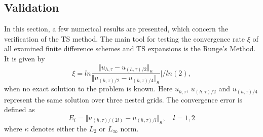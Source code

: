 \documentclass[11pt,a4paper,twoside]{article}
\begin{document}
\subsection{Validation}
In this section, a few numerical results are presented, which concern the verification of the TS method. The main tool for testing the convergence rate $\xi$ of all examined finite difference schemes and TS expansions is the Runge's Method. It is given by
\begin{equation}\label{Runge}
\xi = ln  \frac{\Vert u_{h,\tau} - u_{(h,\tau)/2} \Vert_\kappa } {\Vert  u_{(h,\tau)/2} - u_{(h,\tau)/4} \Vert_\kappa  } | / ln(2),
\end{equation}
when no exact solution to the problem is known. Here $u_{h,\tau}$, $u_{(h,\tau)/2}$ and $u_{(h,\tau)/4}$ represent the same solution over three nested grids. The convergence error is defined as
\begin{equation}\label{Norm}
E_i = \Vert u_{(h,\tau)/(2l)} - u_{(h,\tau)/l} \Vert_\kappa, \quad l = 1,2
\end{equation}
where $\kappa$ denotes either the $L_2$ or $L_\infty$  norm.
\end{document}

